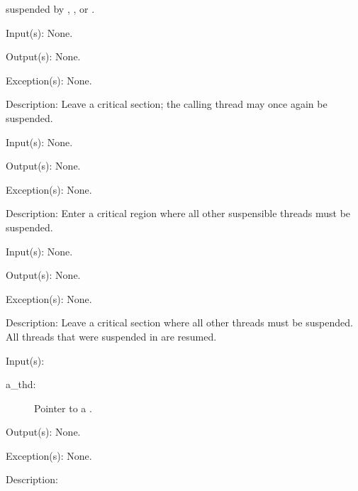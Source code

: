\begin{capi}
\begin{capilist}
		suspended by , ,
		or .
	\end{capilist}
\label{thd_crit_leave}
	\begin{capilist}
	\item[Input(s): ] None.
	\item[Output(s): ] None.
	\item[Exception(s): ] None.
	\item[Description: ]
		Leave a critical section; the calling thread may once again be
		suspended.
	\end{capilist}
\label{thd_single_enter}
	\begin{capilist}
	\item[Input(s): ] None.
	\item[Output(s): ] None.
	\item[Exception(s): ] None.
	\item[Description: ]
		Enter a critical region where all other suspensible threads must
		be suspended.
	\end{capilist}
\label{thd_single_leave}
	\begin{capilist}
	\item[Input(s): ] None.
	\item[Output(s): ] None.
	\item[Exception(s): ] None.
	\item[Description: ]
		Leave a critical section where all other threads must be
		suspended.  All threads that were suspended in
		 are resumed.
	\end{capilist}
\label{thd_suspend}
	\begin{capilist}
	\item[Input(s): ]
		\begin{description}\item[]
		\item[a\_thd: ]
			Pointer to a \classname{thd}.
		\end{description}
	\item[Output(s): ] None.
	\item[Exception(s): ] None.
	\item[Description: ]

\end{capilist}
\end{capi}

